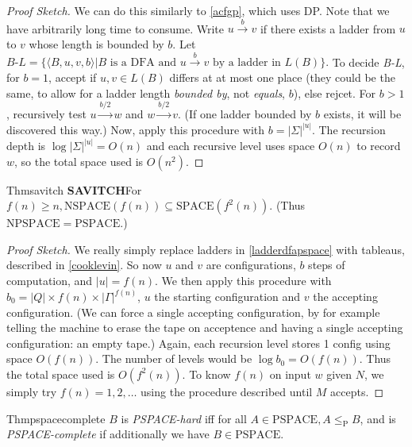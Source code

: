 \begin{proof}[Proof Sketch]
  We can do this similarly to \ref{acfgp}, which uses DP. Note that we have arbitrarily long time to consume. Write $u\xrightarrow{b}v$ if there exists a ladder from $u$ to $v$ whose length is bounded by $b$. Let $\textit{B-L}=\{\langle B,u,v,b\rangle|B\text{ is a DFA and }u\xrightarrow{b} v\text{ by a ladder in }L(B)\}.$ To decide \textit{B-L}, for $b=1$, accept if $u,v\in L(B)$ differs at at most one place (they could be the same, to allow for a ladder length \textit{bounded by}, not \textit{equals}, $b$), else rejcet. For $b>1$, recursively test $u\xrightarrow{b/2}w$ and $w\xrightarrow{b/2}v$. (If one ladder bounded by $b$ exists, it will be discovered this way.) Now, apply this procedure with $b=|\Sigma|^{|u|}$. The recursion depth is $\log |\Sigma|^{|u|}=O(n)$ and each recursive level uses space $O(n)$ to record $w$, so the total space used is $O(n^2)$.
\end{proof}

\begin{reference}{Thm}{savitch}
  \textbf{SAVITCH}\quad For $f(n)\geq n, \mathrm{NSPACE}(f(n))\subseteq \mathrm{SPACE}(f^2(n))$. (Thus $\mathrm{NPSPACE}=\mathrm{PSPACE}$.)
\end{reference}

\begin{proof}[Proof Sketch]
  We really simply replace ladders in \ref{ladderdfapspace} with tableaus, described in \ref{cooklevin}. So now $u$ and $v$ are configurations, $b$ steps of computation, and $|u|=f(n)$. We then apply this procedure with $b_0=|Q|\times f(n)\times |\Gamma|^{f(n)}$, $u$ the starting configuration and $v$ the accepting configuration. (We can force a single accepting configuration, by for example telling the machine to erase the tape on acceptence and having a single accepting configuration: an empty tape.) Again, each recursion level stores 1 config using space $O(f(n))$. The number of levels would be $\log b_0=O(f(n))$. Thus the total space used is $O(f^2(n))$. To know $f(n)$ on input $w$ given $N$, we simply try $f(n)=1,2,\dots$ using the procedure described until $M$ accepts.
\end{proof}

\begin{reference}{Thm}{pspacecomplete}
  $B$ is \emph{PSPACE-hard} iff for all $A\in \mathrm{PSPACE},A\leq_{\mathrm{P}} B$, and is \emph{PSPACE-complete} if additionally we have $B\in \mathrm{PSPACE}$.
\end{reference}

